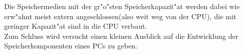 Die Speichermedien mit der gr"o"sten Speicherkapazit"at werden dabei wie erw"ahnt meist extern angeschlossen(also \glqq weit weg\grqq{} von der CPU), die mit geringer Kapazit"at sind in die CPU verbaut.
\\
Zum Schluss wird versucht einen kleinen Ausblick auf die Entwicklung der Speicherkomponenten eines PCs zu geben.


